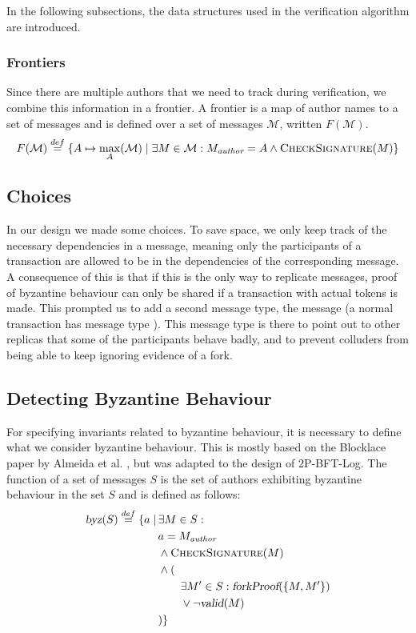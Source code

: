 \documentclass{article}
\begin{document}
In the following subsections, the data structures used in the verification algorithm are introduced.

\subsubsection{Frontiers}
\label{sec:frontier}
Since there are multiple authors that we need to track during verification, we combine this information in a frontier. A frontier is a map of author names to a set of messages and is defined over a set of messages $\mathcal M$, written $F(\mathcal M)$.
\[
    F(\mathcal M) \stackrel{def}{=} \{A \mapsto \max_A(\mathcal M) \mid \exists M \in \mathcal M : M_\emph{author} = A \land \textsc{CheckSignature}(M)\}
\]

\subsection{Choices}
\label{sec:choices}
In our design we made some choices. To save space, we only keep track of the necessary dependencies in a message, meaning only the participants of a transaction are allowed to be in the dependencies of the corresponding message. A consequence of this is that if this is the only way to replicate messages, proof of byzantine behaviour can only be shared if a transaction with actual tokens is made. This prompted us to add a second message type, the  message (a normal transaction has message type ).
This message type is there to point out to other replicas that some of the participants behave badly, and to prevent colluders from being able to keep ignoring evidence of a fork.

\subsection{Detecting Byzantine Behaviour}
For specifying invariants related to byzantine behaviour, it is necessary to define what we consider byzantine behaviour. This is mostly based on the Blocklace paper by Almeida et al. \cite{blocklace-crdt}, but was adapted to the design of 2P-BFT-Log.
The function  of a set of messages $S$ is the set of authors exhibiting byzantine behaviour in the set $S$ and is defined as follows:
\begin{align*}
    \textsl{byz}(S) \stackrel{def}{=} \{a \mid\,&\exists M \in S : \\
    &a = M_\emph{author}\\
    &\land \textsc{CheckSignature}(M)\\
    &\land (\\
    &\qquad \exists M' \in S : \textsl{forkProof}(\{M, M'\}) \\
    &\qquad \lor \lnot \textsl{valid}(M) \\
    &)\}
\end{align*}
\end{document}
